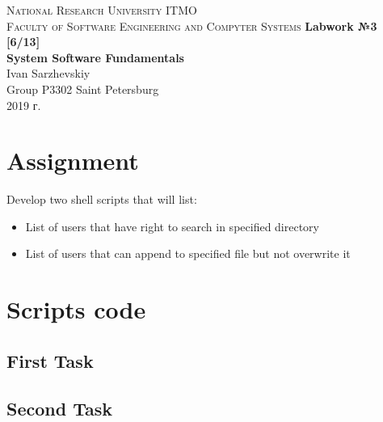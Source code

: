 \documentclass[12pt, a4paper]{article}
\begin{document}
\begin{titlepage}
\begin{center}

\textsc{National Research University ITMO\\[4mm]
Faculty of Software Engineering and Compyter Systems}
\vfill
\textbf{Labwork №3 [6/13]\\[4mm]
System Software Fundamentals\\[16mm]
}
Ivan Sarzhevskiy
\\[2mm]Group P3302
\vfill
Saint Petersburg\\[2mm]
2019 г.

\end{center}
\end{titlepage}

\section*{Assignment}
Develop two shell scripts that will list:
\begin{itemize}
  \item List of users that have right to search in specified directory
  \item List of users that can append to specified file but not overwrite it
\end{itemize}

\section*{Scripts code}
\subsection*{First Task}



\subsection*{Second Task}

\end{document}
